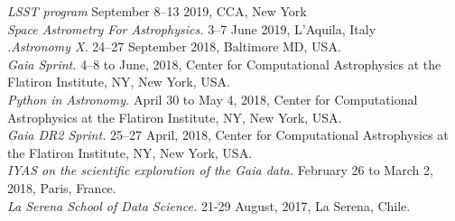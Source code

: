 \documentclass[10pt]{cv}
\begin{document}
\begin{llist}

\textit{LSST program} September 8--13 2019, CCA, New York\\
\textit{Space Astrometry For Astrophysics.} 3--7 June 2019, L'Aquila, Italy\\
\textit{.Astronomy X.} 24--27 September 2018, Baltimore MD, USA.\\
\textit{Gaia Sprint.} 4--8 to June, 2018, Center for Computational Astrophysics at the Flatiron Institute, NY, New York, USA.\\
\textit{Python in Astronomy.}  April 30 to May 4, 2018, Center for Computational Astrophysics at the Flatiron Institute, NY, New York, USA. \\
\textit{Gaia DR2 Sprint.} 25--27 April, 2018, Center for Computational Astrophysics at the Flatiron Institute, NY, New York, USA. \\
\textit{IYAS on the scientific exploration of the Gaia data.} February 26 to March 2, 2018, Paris, France.\\
\textit{La Serena School of Data Science.} 21-29 August, 2017, La Serena, Chile.




\end{llist}
\end{document}
